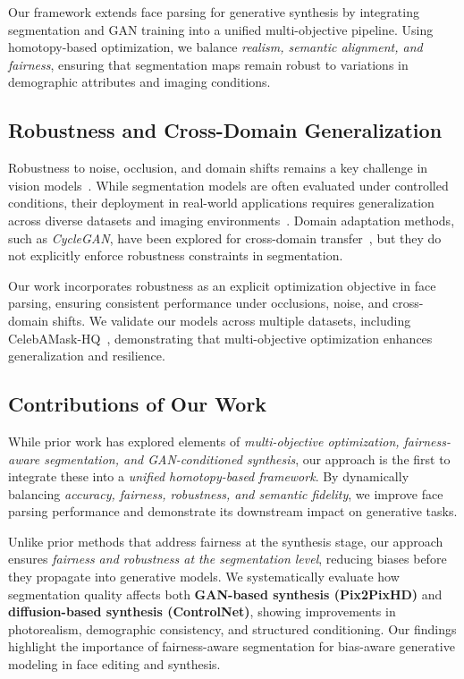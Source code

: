 Our framework extends face parsing for generative synthesis by integrating segmentation and GAN training into a unified multi-objective pipeline. Using homotopy-based optimization, we balance \textit{realism, semantic alignment, and fairness}, ensuring that segmentation maps remain robust to variations in demographic attributes and imaging conditions.

\subsection{Robustness and Cross-Domain Generalization}
Robustness to noise, occlusion, and domain shifts remains a key challenge in vision models~\cite{geirhos2018imagenet, hendrycks2019benchmarking}. While segmentation models are often evaluated under controlled conditions, their deployment in real-world applications requires generalization across diverse datasets and imaging environments~\cite{minaee2021image}. Domain adaptation methods, such as \textit{CycleGAN}, have been explored for cross-domain transfer~\cite{zhu2017unpaired}, but they do not explicitly enforce robustness constraints in segmentation.

Our work incorporates robustness as an explicit optimization objective in face parsing, ensuring consistent performance under occlusions, noise, and cross-domain shifts. We validate our models across multiple datasets, including CelebAMask-HQ~\cite{CelebAMask-HQ}, demonstrating that multi-objective optimization enhances generalization and resilience.

\subsection{Contributions of Our Work}
While prior work has explored elements of \textit{multi-objective optimization, fairness-aware segmentation, and GAN-conditioned synthesis}, our approach is the first to integrate these into a \textit{unified homotopy-based framework}. By dynamically balancing \textit{accuracy, fairness, robustness, and semantic fidelity}, we improve face parsing performance and demonstrate its downstream impact on generative tasks.

Unlike prior methods that address fairness at the synthesis stage, our approach ensures \textit{fairness and robustness at the segmentation level}, reducing biases before they propagate into generative models. We systematically evaluate how segmentation quality affects both \textbf{GAN-based synthesis (Pix2PixHD)} and \textbf{diffusion-based synthesis (ControlNet)}, showing improvements in photorealism, demographic consistency, and structured conditioning. Our findings highlight the importance of fairness-aware segmentation for bias-aware generative modeling in face editing and synthesis.
